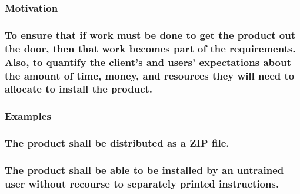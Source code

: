 \documentclass[
]{article}
\begin{document}
\hypertarget{motivation-46}{%
\subsubsection{Motivation}\label{motivation-46}}

\hypertarget{to-ensure-that-if-work-must-be-done-to-get-the-product-out-the-door-then-that-work-becomes-part-of-the-requirements.-also-to-quantify-the-clients-and-users-expectations-about-the-amount-of-time-money-and-resources-they-will-need-to-allocate-to-install-the-product.}{%
\subsubsection{To ensure that if work must be done to get the product
out the door, then that work becomes part of the requirements. Also, to
quantify the client's and users' expectations about the amount of time,
money, and resources they will need to allocate to install the
product.}\label{to-ensure-that-if-work-must-be-done-to-get-the-product-out-the-door-then-that-work-becomes-part-of-the-requirements.-also-to-quantify-the-clients-and-users-expectations-about-the-amount-of-time-money-and-resources-they-will-need-to-allocate-to-install-the-product.}}

\hypertarget{examples-31}{%
\subsubsection{Examples}\label{examples-31}}

\hypertarget{the-product-shall-be-distributed-as-a-zip-file.}{%
\subsubsection{\texorpdfstring{The product shall be distributed as a ZIP
file.
}{The product shall be distributed as a ZIP file. }}\label{the-product-shall-be-distributed-as-a-zip-file.}}

\hypertarget{the-product-shall-be-able-to-be-installed-by-an-untrained-user-without-recourse-to-separately-printed-instructions.}{%
\subsubsection{\texorpdfstring{The product shall be able to be installed
by an untrained user without recourse to separately printed
instructions.
}{The product shall be able to be installed by an untrained user without recourse to separately printed instructions. }}\label{the-product-shall-be-able-to-be-installed-by-an-untrained-user-without-recourse-to-separately-printed-instructions.}}
\end{document}
